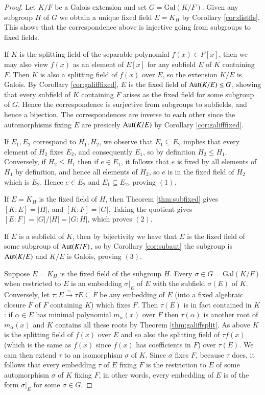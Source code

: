 \documentclass[12pt, a4paper, oneside, openright, titlepage]{book}
\begin{document}
\begin{proof}
    Let $K/F$ be a Galois extension and set $G = \text{Gal}(K/F)$. Given any subgroup $H$ of $G$ we obtain a unique fixed field $E = K_H$ by Corollary \ref{cor:distffs}. This shows that the correspondence above is injective going from subgroups to fixed fields.

    If $K$ is the splitting field of the separable polynomial $f(x) \in F[x]$, then we may also view $f(x)$ as an element of $E[x]$ for any subfield $E$ of $K$ containing $F$. Then $K$ is also a splitting field of $f(x)$ over $E$, so the extension $K/E$ is Galois. By Corollary \ref{cor:galifffixed}, $E$ is the fixed field of $\operatorname{Aut}(K/E)\leq G$, showing that every subfield of $K$ containing $F$ arises as the fixed field for some subgroup of $G$. Hence the correspondence is surjective from subgroups to subfields, and hence a bijection. The correspondences are inverse to each other since the automorphisms fixing $E$ are presicely $\operatorname{Aut}(K/E)$ by Corollary \ref{cor:galifffixed}.

    If $E_1,E_2$ correspond to $H_1,H_2$, we observe that $E_1 \subseteq E_2$ implies that every element of $H_2$ fixes $E_2$, and consequently $E_1$, so by definition $H_2 \leq H_1$. Conversely, if $H_2 \leq H_1$ then if $e \in E_1$, it follows that $e$ is fixed by all elements of $H_1$ by definition, and hence all elements of $H_2$, so $e$ is in the fixed field of $H_2$ which is $E_2$. Hence $e \in E_2$ and $E_1 \subseteq E_2$, proving $(1)$.

    If $E = K_H$ is the fixed field of $H$, then Theorem \ref{thm:subfixed} gives $[K:E] = |H|$, and $[K:F] = |G|$. Taking the quotient gives $[E:F] = |G|/|H| = |G:H|$, which proves $(2)$.

    If $E$ is a subfield of $K$, then by bijectivity we have that $E$ is the fixed field of some subgroup of $\operatorname{Aut}(K/F)$, so by Corollary \ref{cor:subaut} the subgroup is $\operatorname{Aut}(K/E)$ and $K/E$ is Galois, proving $(3)$.

    Suppose $E = K_H$ is the fixed field of the subgroup $H$. Every $\sigma \in G = \text{Gal}(K/F)$ when restricted to $E$ is an embedding $\sigma\vert_E$ of $E$ with the subfield $\sigma(E)$ of $K$. Conversely, let $\tau:E\xrightarrow{\sim}\tau{E}\subseteq \overline{F}$ be any embedding of $E$ (into a fixed algebraic closure $\overline{F}$ of $F$ containing $K$) which fixes $F$. Then $\tau(E)$ is in fact contained in $K$: if $\alpha \in E$ has minimal polynomial $m_{\alpha}(x)$ over $F$ then $\tau(\alpha)$ is another root of $m_{\alpha}(x)$ and $K$ contains all these roots by Theorem \ref{thm:galiffsplit}. As above $K$ is the splitting field of $f(x)$ over $E$ and so also the splitting field of $\tau f(x)$ (which is the same as $f(x)$ since $f(x)$ has coefficients in $F$) over $\tau(E)$. We cam then extend $\tau$ to an isomorphism $\sigma$ of $K$. Since $\sigma$ fixes $F$, because $\tau$ does, it follows that every embedding $\tau$ of $E$ fixing $F$ is the restriction to $E$ of some automorphism $\sigma$ of $K$ fixing $F$, in other words, every embedding of $E$ is of the form $\sigma\vert_E$ for some $\sigma \in G$.


\end{proof}
\end{document}
